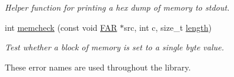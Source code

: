 \begin{DoxyCompactItemize}
\begin{DoxyCompactList}\small\item\em Helper function for printing a hex dump of memory to stdout. \end{DoxyCompactList}\item 
int \hyperlink{group__hal_gaae7cb3384b4bbd83726511ccfbd747d3}{memcheck} (const void \hyperlink{group__hal_gaef060b3456fdcc093a7210a762d5f2ed}{F\-A\-R} $\ast$src, int c, size\-\_\-t \hyperlink{group__zdo_gab2b3adeb2a67e656ff030b56727fd0ac}{length})
\begin{DoxyCompactList}\small\item\em Test whether a block of memory is set to a single byte value. \end{DoxyCompactList}\end{DoxyCompactItemize}
\label{_amgrp01747264fe7bf50731df0522c351974e}%
These error names are used throughout the library.

